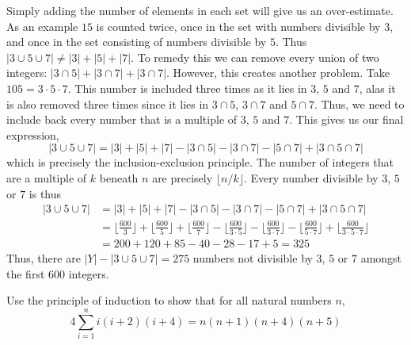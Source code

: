 \documentclass[a4paper, english, 12pt]{article} %
\begin{document}
\begin{answer}
  Simply adding the number of elements in each set will give us an
  over-estimate. As an example $15$ is counted twice, once in the set with
  numbers divisible by 3, and once in the set consisting of numbers divisible by
  $5$. Thus $|3 \cup 5 \cup 7| \neq |3| + |5|+|7|$. To remedy this we can remove
  every union of two integers: $|3 \cap 5| + |3 \cap 7| + |3 \cap 7|$. However,
  this creates another problem. Take $105 = 3 \cdot 5 \cdot 7$. This number is
  included three times as it lies in $3$, $5$ and $7$, alas it is also removed
  three times since it lies in $3 \cap 5$, $3 \cap 7$ and $5 \cap 7$. Thus, we
  need to include back every number that is a multiple of $3$, $5$ and $7$. This
  gives us our final expression,
  \begin{equation*}
    |3 \cup 5 \cup 7| = |3| + |5| + |7| - |3 \cap 5| - |3 \cap 7| - |5 \cap 7| + |3 \cap 5 \cap 7| 
  \end{equation*}
  which is precisely the inclusion-exclusion principle.
  The number of integers that are a multiple of $k$ beneath $n$ are precisely
  $\lfloor {n/k} \rfloor$. Every number divisible by $3$, $5$ or $7$ is thus
  \begin{align*}
        |3 \cup 5 \cup 7|
    & = |3| + |5| + |7| - |3 \cap 5| - |3 \cap 7| - |5 \cap 7| + |3 \cap 5 \cap 7| \\
    & = \lfloor \frac{600}{3} \rfloor
    +   \lfloor \frac{600}{5}  \rfloor
    +  \lfloor \frac{600}{7}  \rfloor  
    -  \lfloor \frac{600}{3\cdot 5}  \rfloor
    -  \lfloor \frac{600}{3\cdot 7}  \rfloor 
    -  \lfloor \frac{600}{5 \cdot 7}  \rfloor
      +  \lfloor \frac{600}{3\cdot 5\cdot 7} \rfloor  \\
    & = 200 + 120 + 85 - 40 - 28 - 17 + 5 
      = 325
  \end{align*}
  Thus, there are $|Y| - |3 \cup 5 \cup 7| = 275$ numbers not divisible by $3$,
  $5$ or $7$ amongst the first $600$ integers.
\end{answer}

\begin{problem}
  Use the principle of induction to show that for all natural numbers $n$,
  \begin{equation*}
    4 \sum_{i=1}^n i(i+2)(i+4) = n(n+1)(n+4)(n+5)
  \end{equation*}
\end{problem}
\end{document}
